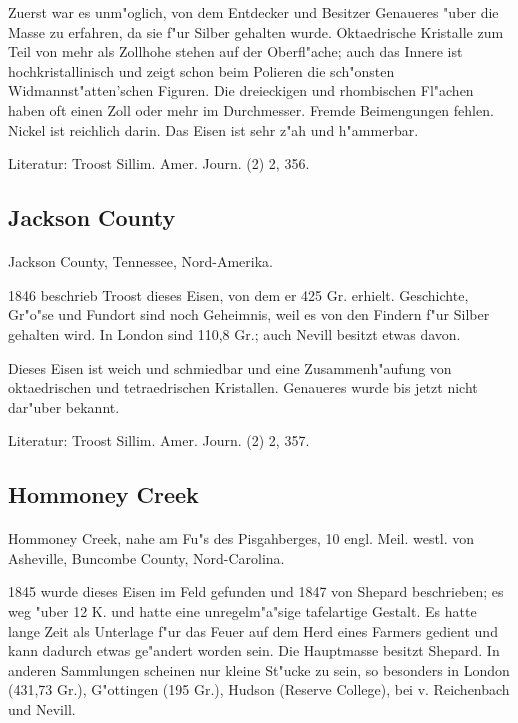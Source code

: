 \documentclass[a4paper, 11pt, oneside]{article}
\begin{document}
Zuerst war es unm"oglich, von dem Entdecker und Besitzer Genaueres "uber die Masse zu erfahren, da sie f"ur Silber gehalten wurde. Oktaedrische Kristalle zum Teil von mehr als Zollhohe stehen auf der Oberfl"ache; auch das Innere ist hochkristallinisch und zeigt schon beim Polieren die sch"onsten Widmannst"atten'schen Figuren. Die dreieckigen und rhombischen Fl"achen haben oft einen Zoll oder mehr im Durchmesser. Fremde Beimengungen fehlen. Nickel ist reichlich darin. Das Eisen ist sehr z"ah und h"ammerbar.

Literatur: Troost Sillim. Amer. Journ. (2) 2, 356.

\subsection{Jackson County}
\normalsize
\paragraph{}
Jackson County, Tennessee, Nord-Amerika.

1846 beschrieb Troost dieses Eisen, von dem er 425 Gr. erhielt. Geschichte, Gr"o"se und Fundort sind noch Geheimnis, weil es von den Findern f"ur Silber gehalten wird. In London sind 110,8 Gr.; auch Nevill besitzt etwas davon.

Dieses Eisen ist weich und schmiedbar und eine Zusammenh"aufung von oktaedrischen und tetraedrischen Kristallen. Genaueres wurde bis jetzt nicht dar"uber bekannt.

Literatur: Troost Sillim. Amer. Journ. (2) 2, 357.

\subsection{Hommoney Creek}
\normalsize
\paragraph{}
Hommoney Creek, nahe am Fu"s des Pisgahberges, 10 engl. Meil. westl. von Asheville, Buncombe County, Nord-Carolina.

1845 wurde dieses Eisen im Feld gefunden und 1847 von Shepard beschrieben; es weg "uber 12 K. und hatte eine unregelm"a"sige tafelartige Gestalt. Es hatte lange Zeit als Unterlage f"ur das Feuer auf dem Herd eines Farmers gedient und kann dadurch etwas ge"andert worden sein. Die Hauptmasse besitzt Shepard. In anderen Sammlungen scheinen nur kleine St"ucke zu sein, so besonders in London (431,73 Gr.), G"ottingen (195 Gr.), Hudson (Reserve College), bei v. Reichenbach und Nevill.
\end{document}
